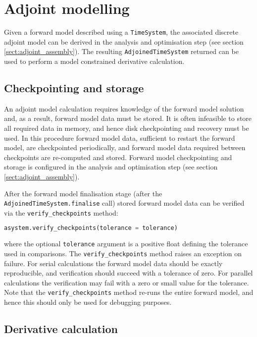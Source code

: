 \documentclass[a4paper]{book}
\begin{document}
\section{Adjoint modelling}

Given a forward model described using a \verb+TimeSystem+, the associated
discrete adjoint model can be derived in the analysis and optimisation step (see
section \ref{sect:adjoint_assembly}). The resulting \verb+AdjoinedTimeSystem+
returned can be used to perform a model constrained derivative calculation.

\subsection{Checkpointing and storage}

An adjoint model calculation requires knowledge of the forward model solution
and, as a result, forward model data must be stored. It is often infeasible to
store all required data in memory, and hence disk checkpointing and recovery
must be used. In this procedure forward model data, sufficient to restart the
forward model, are checkpointed periodically, and forward model data required
between checkpoints are re-computed and stored. Forward model checkpointing and
storage is configured in the analysis and optimisation step (see section
\ref{sect:adjoint_assembly}).

After the forward model finalisation stage (after the \linebreak
\verb+AdjoinedTimeSystem.finalise+ call) stored forward model data can be
verified via the \verb+verify_checkpoints+ method:
\begin{lstlisting}[language = python, frame = single, basicstyle=\footnotesize]
asystem.verify_checkpoints(tolerance = tolerance)
\end{lstlisting}
where the optional \verb+tolerance+ argument is a positive float defining the
tolerance used in comparisons. The \verb+verify_checkpoints+ method raises an
exception on failure. For serial calculations the forward model data should be
exactly reproducible, and verification should succeed with a tolerance of zero.
For parallel calculations the verification may fail with a zero or small value
for the tolerance. Note that the \verb+verify_checkpoints+ method re-runs the
entire forward model, and hence this should only be used for debugging purposes.

\subsection{Derivative calculation}
\end{document}
